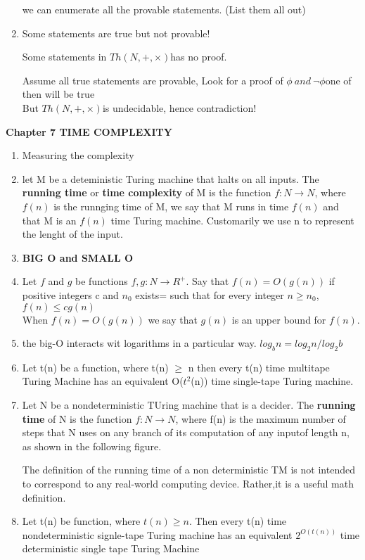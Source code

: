 \documentclass{article}
\newcommand{\imp}[1]{\textbf{#1}}
\newcommand{\nth}{$ Th(N,+,\times) $}
\begin{document}
\begin{enumerate}[1., leftmargin = 0.6cm]
        we can enumerate all the provable statements. (List them all out)
    \item Some statements are true but not provable!
        
    Some statements in  \nth has no proof.
        
    Assume all true statements are provable, Look for a proof of $\phi\ and\ \neg\phi
        $one of then will be true\\
        But \nth is undecidable, hence contradiction!
\end{enumerate}

\textbf{Chapter 7 TIME COMPLEXITY}
\begin{enumerate}[1., leftmargin = 0.6cm]
\itemsep0em
\item  Measuring the complexity
\item let M be a deteministic Turing machine that halts on all inputs. The \imp{running
    time} or \imp{time complexity} of M is the function $f: N \rightarrow N$, where
    $f(n)$ is the runnging time of M, we say that M runs in time $f(n)$ and that M is
    an $f(n)$ time Turing machine. Customarily we use n to represent the lenght of the 
    input.
\item \imp{BIG O and SMALL O}
\item Let $f$ and $g$ be functions $f,g: N \rightarrow R^+$. Say that $f(n) = O(g(n))$
if positive integers c and $n_0$ exists= such that for every integer $n \ge n_0$,\\
    $f(n) \le cg(n)$\\
When $f(n) = O(g(n))$ we say that $g(n)$ is an upper bound for $f(n)$.
\item the big-O interacts wit logarithms in a particular way. $log_bn = log_2n /
log_2b$
\item Let t(n) be a function, where t(n) $\ge$ n then every t(n) time multitape Turing
Machine has an equivalent O($t^2$(n)) time single-tape Turing machine.
\item Let N be a nondeterministic TUring machine that is a decider. The \imp{running
time} of N is the function $f:N \rightarrow N$, where f(n) is the maximum number of
steps that N uses on any branch of its computation of any inputof length n, as shown in
the following figure.

The definition of the running time of a non deterministic TM is not intended to
correspond to any real-world computing device. Rather,it is a useful math definition.

\item Let t(n) be function, where $t(n) \ge n$. Then every t(n) time nondeterministic
signle-tape Turing machine has an equivalent $2^{O(t(n))}$ time deterministic single
tape Turing Machine


\end{enumerate}
\end{document}
